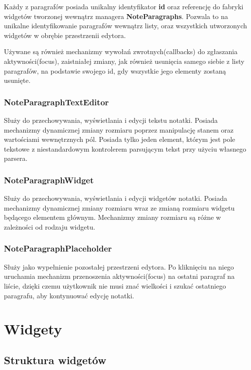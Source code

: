 Każdy z paragrafów posiada unikalny identyfikator \textbf{id} oraz referencję do fabryki widgetów tworzonej wewnątrz managera \textbf{NoteParagraphs}.
Pozwala to na unikalne identyfikowanie paragrafów wewnątrz listy, oraz wszystkich utworzonych widgetów w obrębie przestrzenii edytora.

Używane są również mechanizmy wywołań zwrotnych(callbacks) do zgłaszania aktywności(focus), zaistniałej zmiany, jak również usunięcia samego siebie z listy paragrafów, na podstawie swojego id, gdy wszystkie jego elementy zostaną usunięte.

\subsubsection{NoteParagraphTextEditor}

Służy do przechowywania, wyświetlania i edycji tekstu notatki. Posiada mechanizmy dynamicznej zmiany rozmiaru poprzez manipulację stanem oraz wartościami wewnętrznych pól. Posiada tylko jeden element, którym jest pole tekstowe z niestandardowym kontrolerem parsującym tekst przy użyciu własnego parsera.

\subsubsection{NoteParagraphWidget}

Służy do przechowywania, wyświetlania i edycji widgetów notatki. Posiada mechanizmy dynamicznej zmiany rozmiaru wraz ze zmianą rozmiaru widgetu będącego elementem głównym. Mechanizmy zmiany rozmiaru są różne w zależności od rodzaju widgetu.

\subsubsection{NoteParagraphPlaceholder}

Służy jako wypełnienie pozostałej przestrzeni edytora. Po kliknięciu na niego uruchamia mechanizm przenoszenia aktywności(focus) na ostatni paragraf na liście, dzięki czemu użytkownik nie musi znać wielkości i szukać ostatniego paragrafu, aby kontynuować edycję notatki.


\section{Widgety}

\subsection{Struktura widgetów}

